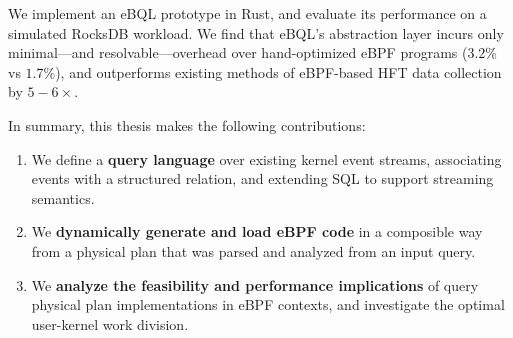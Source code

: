 We implement an eBQL prototype in Rust, and evaluate its performance on a simulated RocksDB
workload. We find that eBQL's abstraction layer incurs only minimal---and resolvable---overhead over
hand-optimized eBPF programs ($3.2\%$ vs $1.7\%$), and outperforms existing methods of eBPF-based
HFT data collection by $5-6\times$.

In summary, this thesis makes the following contributions:
\begin{enumerate}
    \item We define a \textbf{query language} over existing kernel event streams, associating events
        with a structured relation, and extending SQL to support streaming semantics.
    \item We \textbf{dynamically generate and load eBPF code} in a composible way from a physical
        plan that was parsed and analyzed from an input query.
    \item We \textbf{analyze the feasibility and performance implications} of query physical plan
        implementations in eBPF contexts, and investigate the optimal user-kernel work division.
\end{enumerate}



